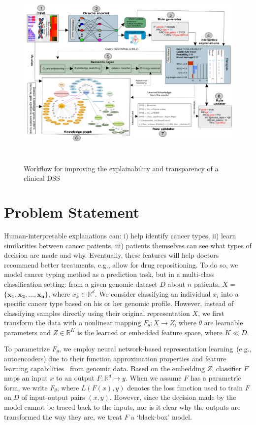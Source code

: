 \begin{figure}[h]
	\centering
	\includegraphics[width=\textwidth,height=95mm]{images/reasoning_wf.png}	
    \caption{Workflow for improving the explainability and transparency of a clinical DSS}
	\label{fig:wf_overall_approach}
\end{figure}

\section{Problem Statement} \label{problem_challenges}
Human-interpretable explanations can: i) help identify cancer types, ii) learn similarities between cancer patients, iii) patients themselves can see what types of decision are made and why. Eventually, these features will help doctors recommend better treatments, e.g., allow for drug repositioning. To do so, we model cancer typing method as a prediction task, but in a multi-class classification setting: from a given genomic dataset $D$ about $n$ patients, $X$ = ${\mathbf{\{x_1,x_2,..., x_n}}\}$, where $x_k \in \mathbb{R}^{d}$. We consider classifying an individual $x_i$ into a specific cancer type based on his or her genomic profile. However, instead of classifying samples directly using their original representation $X$, we first transform the data with a nonlinear mapping $F_{\theta}: X \rightarrow Z$, where $\theta$ are learnable parameters and $Z \in \mathbb{R}^{K}$ is the learned or embedded feature space, where $K \ll D$. 

\hspace*{3.5mm} To parametrize $F_{\theta}$, we employ neural network-based representation learning~(e.g., autoencoders) due to their function approximation properties and feature learning capabilities~\cite{xie2016unsupervised} from genomic data. Based on the embedding $Z$, classifier $F$ maps an input $x$ to an output $F: \mathbb{R}^{d} \mapsto y$. When we assume $F$ has a parametric form, we write $F_{\theta}$, where ${L}(F(x), y)$ denotes the loss function used to train $F$ on $D$ of input-output pairs $(x,y)$. However, since the decision made by the model cannot be traced back to the inputs, nor is it clear why the outputs are transformed the way they are, we treat $F$ a `black-box' model. 

